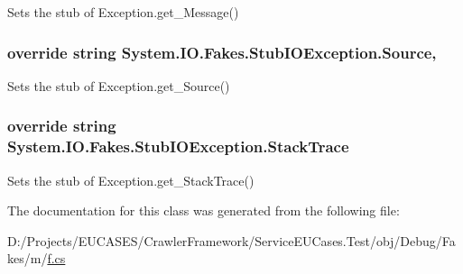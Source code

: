 Sets the stub of Exception.\-get\-\_\-\-Message()

\hypertarget{class_system_1_1_i_o_1_1_fakes_1_1_stub_i_o_exception_a369ede03ae458b3edb6ec4e742ee7991}{
\subsubsection[{Source}]{\setlength{\rightskip}{0pt plus 5cm}override string System.\-I\-O.\-Fakes.\-Stub\-I\-O\-Exception.\-Source\hspace{0.3cm}{\ttfamily [get]}, {\ttfamily [set]}}}\label{class_system_1_1_i_o_1_1_fakes_1_1_stub_i_o_exception_a369ede03ae458b3edb6ec4e742ee7991}


Sets the stub of Exception.\-get\-\_\-\-Source()

\hypertarget{class_system_1_1_i_o_1_1_fakes_1_1_stub_i_o_exception_ac2eda0265cba775b382f7e5ed5c60284}{
\subsubsection[{Stack\-Trace}]{\setlength{\rightskip}{0pt plus 5cm}override string System.\-I\-O.\-Fakes.\-Stub\-I\-O\-Exception.\-Stack\-Trace\hspace{0.3cm}{\ttfamily [get]}}}\label{class_system_1_1_i_o_1_1_fakes_1_1_stub_i_o_exception_ac2eda0265cba775b382f7e5ed5c60284}


Sets the stub of Exception.\-get\-\_\-\-Stack\-Trace()



The documentation for this class was generated from the following file\-:\begin{DoxyCompactItemize}
\item 
D\-:/\-Projects/\-E\-U\-C\-A\-S\-E\-S/\-Crawler\-Framework/\-Service\-E\-U\-Cases.\-Test/obj/\-Debug/\-Fakes/m/\hyperlink{m_2f_8cs}{f.\-cs}\end{DoxyCompactItemize}
